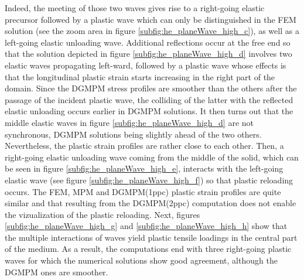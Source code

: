 Indeed, the meeting of those two waves gives rise to a right-going elastic precursor followed by a plastic wave which can only be distinguished in the FEM solution (see the zoom area in figure \ref{subfig:he_planeWave_high_c}), as well as a left-going elastic unloading wave.
Additional reflections occur at the free end so that the solution depicted in figure \ref{subfig:he_planeWave_high_d} involves two elastic waves propagating left-ward, followed by a plastic wave whose effects is that the longitudinal plastic strain starts increasing in the right part of the domain.
Since the DGMPM stress profiles are smoother than the others after the passage of the incident plastic wave, the colliding of the latter with the reflected elastic unloading occurs earlier in DGMPM solutions.
It then turns out that the middle elastic waves in figure \ref{subfig:he_planeWave_high_d} are not synchronous, DGMPM solutions being slightly ahead of the two others.
Nevertheless, the plastic strain profiles are rather close to each other.
%
Then, a right-going elastic unloading wave coming from the middle of the solid, which can be seen in figure \ref{subfig:he_planeWave_high_e}, interacts with the left-going elastic wave (see figure \ref{subfig:he_planeWave_high_f}) so that plastic reloading occurs.
The FEM, MPM and DGMPM(1ppc) plastic strain profiles are quite similar and that resulting from the DGMPM(2ppc) computation does not enable the vizualization of the plastic reloading.
Next, figures \ref{subfig:he_planeWave_high_g} and \ref{subfig:he_planeWave_high_h} show that the multiple interactions of waves yield plastic tensile loadings in the central part of the medium.
As a result, the computations end with three right-going plastic waves for which the numerical solutions show good agreement, although the DGMPM ones are smoother.



